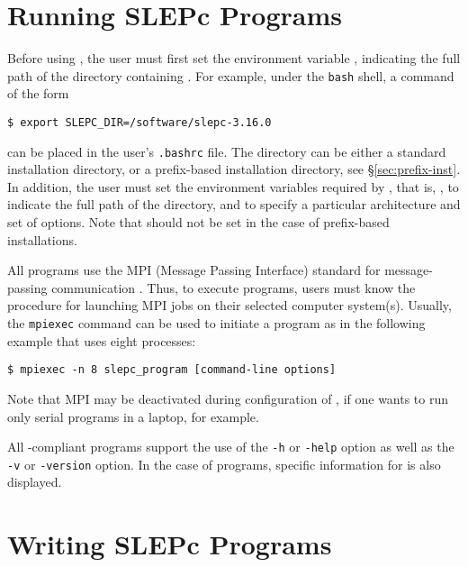 
\section{Running SLEPc Programs}

Before using \slepc, the user must first set the environment variable
, indicating the full path of the directory containing \slepc. For example, under the \texttt{bash} shell, a command of the form
	\begin{Verbatim}[fontsize=\small]
	$ export SLEPC_DIR=/software/slepc-3.16.0
	\end{Verbatim}
can be placed in the user's \Verb!.bashrc! file.
The  directory can be either a standard installation \slepc directory, or a prefix-based installation directory, see \S\ref{sec:prefix-inst}.
In addition, the user must set the environment variables required by \petsc, that is, , to indicate the full path of the \petsc directory, and  to specify a particular architecture and set of options. Note that  should not be set in the case of prefix-based installations.

All \petsc programs use the MPI (Message Passing Interface) standard
for message-passing communication \citep{MPI-Forum:1994:MMI}.  Thus, to execute
\slepc programs, users must know the procedure for launching MPI jobs
on their selected computer system(s).  Usually, the \texttt{mpiexec} command can be used to initiate a program as in the following example that uses eight processes:
	\begin{Verbatim}[fontsize=\small]
	$ mpiexec -n 8 slepc_program [command-line options]
	\end{Verbatim}
Note that MPI may be deactivated during configuration of \petsc, if one wants to run only serial programs in a laptop, for example.

All \petsc-compliant programs support the use of the \Verb!-h!
or \Verb!-help! option as well as the \Verb!-v! or \Verb!-version! option. In the case of \slepc programs, specific information for \slepc is also displayed.

\section{Writing SLEPc Programs}

